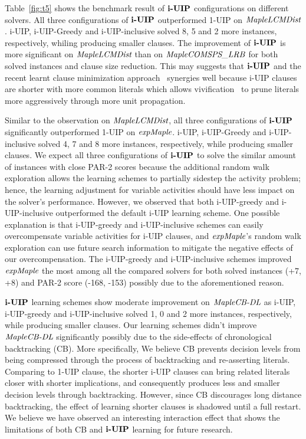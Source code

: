 Table~\ref{fig:t5} shows the benchmark result of $\textbf{i-UIP}$ configurations on different solvers. All three configurations of $\textbf{i-UIP}$ outperformed 1-UIP on $\textit{MapleLCMDist}$. i-UIP, i-UIP-Greedy and i-UIP-inclusive solved 8, 5 and 2 more instances, respectively, whiling producing smaller clauses.  The improvement of $\textbf{i-UIP}$ is more significant on $\textit{MapleLCMDist}$ than on $\textit{MapleCOMSPS\_LRB}$ for both solved instances and clause size reduction. This may suggests that $\textbf{i-UIP}$ and the recent learnt clause minimization approach~\cite{} synergies well because i-UIP clauses are shorter with more common literals which allows vivification~\cite{} to prune literals more aggressively through more unit propagation. 

Similar to the observation on $\textit{MapleLCMDist}$, all three configurations of $\textbf{i-UIP}$ significantly outperformed 1-UIP on $\textit{expMaple}$. i-UIP, i-UIP-Greedy and i-UIP-inclusive solved 4, 7 and 8 more instances, respectively, while producing smaller clauses. We expect all three configurations of $\textbf{i-UIP}$ to solve the similar amount of instances with close PAR-2 scores because the additional random walk exploration allows the learning schemes to partially sidestep the activity problem; hence, the learning adjustment for variable activities should have less impact on the solver's performance. However, we observed that both i-UIP-greedy and i-UIP-inclusive outperformed the default i-UIP learning scheme. One possible explanation is that i-UIP-greedy and i-UIP-inclusive schemes can easily overcompensate variable activities for i-UIP clauses, and $\textit{expMaple}$'s random walk exploration can use future search information to mitigate the negative effects of our overcompensation. The i-UIP-greedy and i-UIP-inclusive schemes improved $\textit{expMaple}$ the most among all the compared solvers for both solved instances (+7, +8) and PAR-2 score (-168, -153) possibly due to the aforementioned reason.

$\textbf{i-UIP}$ learning schemes show moderate improvement on $\textit{MapleCB-DL}$ as i-UIP, i-UIP-greedy and i-UIP-inclusive solved 1, 0 and 2 more instances, respectively, while producing smaller clauses. Our learning schemes didn't improve $\textit{MapleCB-DL}$ significantly possibly due to the side-effects of chronological backtracking (CB). More specifically, We believe CB prevents decision levels from being compressed through the process of backtracking and re-asserting literals. Comparing to 1-UIP clause, the shorter i-UIP clauses can bring related literals closer with shorter implications, and consequently produces less and smaller decision levels through  backtracking. However, since CB discourages long distance backtracking, the effect of learning shorter clauses is shadowed until a full restart.  We believe we have observed an interesting interaction effect that shows the limitations of both CB and $\textbf{i-UIP}$ learning for future research.

